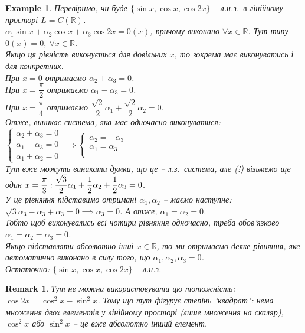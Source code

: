 \documentclass[a4paper, 10pt]{article}
\theoremstyle{theoremdd}
\newtheorem{example}[theorem]{Example}
\newtheorem{remark}[theorem]{Remark}
\begin{document}
	\begin{example}
	Перевіримо, чи буде $\{\sin x, \cos x, \cos 2x\}$ -- л.н.з.\ в лінійному просторі $L = C(\mathbb{R})$.\\
	$\alpha_1 \sin x + \alpha_2 \cos x + \alpha_3 \cos 2x = 0(x)$, причому виконано $\forall x \in \mathbb{R}$. Тут типу $0(x) = 0,\ \forall x \in \mathbb{R}$.\\
	Якщо ця рівність виконується для довільних $x$, то зокрема має виконуватись і для конкретних.\\
	При $x = 0$ отримаємо $\alpha_2 + \alpha_3 = 0$.\\
	При $x = \dfrac{\pi}{2}$ отримаємо $\alpha_1 - \alpha_3 = 0$.\\
	При $x = \dfrac{\pi}{4}$ отримаємо $\dfrac{\sqrt{2}}{2} \alpha_1 + \dfrac{\sqrt{2}}{2} \alpha_2 = 0$.\\
	Отже, виникає система, яка має одночасно виконуватися:\\
	$\begin{cases}
	\alpha_2 + \alpha_3 = 0\\
	\alpha_1 - \alpha_3 = 0\\
	\alpha_1 + \alpha_2 = 0
	\end{cases}
	\implies
	\begin{cases}
	\alpha_2 =  -\alpha_3\\
	\alpha_1 = \alpha_3\\
	\end{cases}
	$\\
	Тут вже можуть виникати думки, що це -- л.з.\ система, але (!) візьмемо ще один $\displaystyle x = \frac{\pi}{3}: \\ \frac{\sqrt{3}}{2}\alpha_1 + \frac{1}{2}\alpha_2 + \frac{1}{2}\alpha_3 = 0$.\\
	У це рівняння підставимо отримані $\alpha_1,\alpha_2$ -- маємо наступне:\\
	$\sqrt{3}\alpha_3 - \alpha_3 + \alpha_3 = 0 \implies \alpha_3 = 0$. А отже, $\alpha_1 = \alpha_2 = 0$.\\
	Тобто щоб виконувались всі чотири рівняння одночасно, треба обов'язково $\alpha_1 = \alpha_2 = \alpha_3 = 0$.\\
	Якщо підставляти абсолютно інші $x \in \mathbb{R}$, то ми отримаємо деяке рівняння, яке автоматично виконано в силу того, що $\alpha_1,\alpha_2,\alpha_3 = 0$.\\
	Остаточно: $\{\sin x, \cos x, \cos 2x\}$ -- л.н.з.
	\end{example}
	
	\begin{remark}
	Тут не можна використовувати цю тотожність: $\cos 2x = \cos ^2 x - \sin ^2 x$. Тому що тут фігурує степінь "квадрат": нема множення двох елементів у лінійному просторі (лише множення на скаляр), $\cos^2 x$ або $\sin^2 x$ -- це вже абсолютно інший елемент.
	\end{remark}
	
\end{document}
